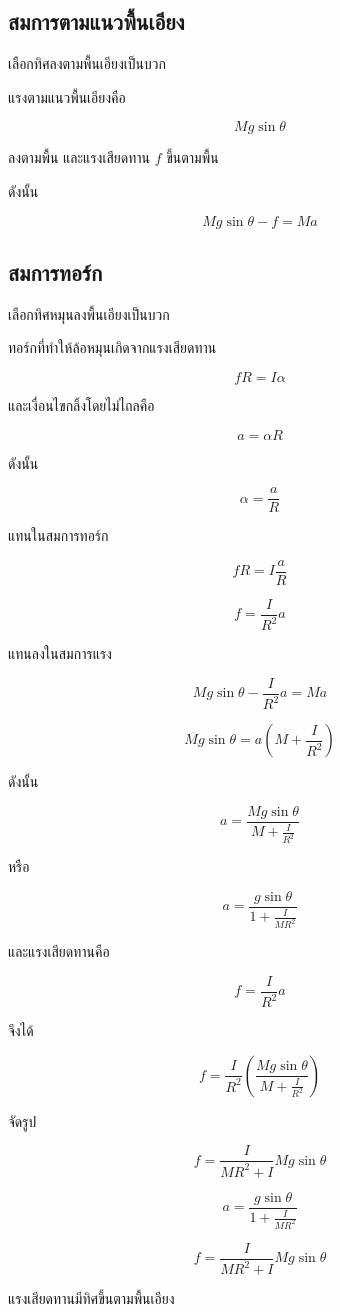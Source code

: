 \subsection{สมการตามแนวพื้นเอียง}

เลือกทิศลงตามพื้นเอียงเป็นบวก

แรงตามแนวพื้นเอียงคือ

\[
Mg\sin\theta
\]

ลงตามพื้น และแรงเสียดทาน $f$ ขึ้นตามพื้น

ดังนั้น

\[
Mg\sin\theta-f=Ma
\]

\subsection{สมการทอร์ก}

เลือกทิศหมุนลงพื้นเอียงเป็นบวก

ทอร์กที่ทำให้ล้อหมุนเกิดจากแรงเสียดทาน

\[
fR=I\alpha
\]

และเงื่อนไขกลิ้งโดยไม่ไถลคือ

\[
a=\alpha R
\]

ดังนั้น

\[
\alpha=\frac{a}{R}
\]

แทนในสมการทอร์ก

\[
fR=I\frac{a}{R}
\]

\[
f=\frac{I}{R^2}a
\]

แทนลงในสมการแรง

\[
Mg\sin\theta-\frac{I}{R^2}a=Ma
\]

\[
Mg\sin\theta=a\left(M+\frac{I}{R^2}\right)
\]

ดังนั้น

\[
a=\frac{Mg\sin\theta}{M+\frac{I}{R^2}}
\]

หรือ

\[
a=\frac{g\sin\theta}{1+\frac{I}{MR^2}}
\]

และแรงเสียดทานคือ

\[
f=\frac{I}{R^2}a
\]

จึงได้

\[
f=
\frac{I}{R^2}
\left(
\frac{Mg\sin\theta}{M+\frac{I}{R^2}}
\right)
\]

จัดรูป

\[
f=\frac{I}{MR^2+I}Mg\sin\theta
\]

\begin{tcolorbox}[title=ล้อกลิ้งลงพื้นเอียงโดยไม่ไถล]
\[
a=\frac{g\sin\theta}{1+\frac{I}{MR^2}}
\]

\[
f=\frac{I}{MR^2+I}Mg\sin\theta
\]

แรงเสียดทานมีทิศขึ้นตามพื้นเอียง
\end{tcolorbox}


